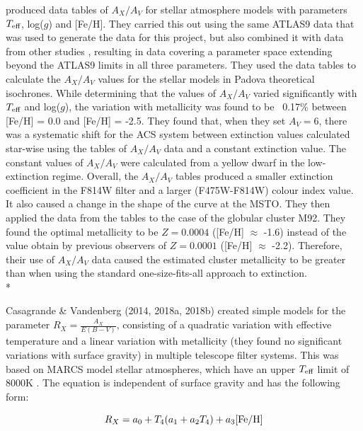 \documentclass[12pt, a4paper]{report}
\begin{document}
\cite{2008PASP..120..583G} produced data tables of $A_{X}/A_{V}$ for stellar atmosphere models with parameters $T_{\textnormal{eff}}$, log($g$) and [Fe/H]. They carried this out using the same ATLAS9 data \citep{2004astro.ph..5087C} that was used to generate the data for this project, but also combined it with data from other studies \cite{2002A&A...391..195G}, resulting in data covering a parameter space extending beyond the ATLAS9 limits in all three parameters. They used the data tables to calculate the $A_{X}/A_{V}$ values for the stellar models in Padova theoretical isochrones. While determining that the values of $A_{X}/A_{V}$ varied significantly with $T_{\textnormal{eff}}$ and log($g$), the variation with metallicity was found to be ~0.17$\%$ between [Fe/H] = 0.0 and [Fe/H] = -2.5. They found that, when they set $A_{V} = 6$, there was a systematic shift for the ACS system between extinction values calculated star-wise using the tables of $A_{X}/A_{V}$ data and a constant extinction value. The constant values of $A_{X}/A_{V}$ were calculated from a yellow dwarf in the low-extinction regime. Overall, the $A_{X}/A_{V}$ tables produced a smaller extinction coefficient in the F814W filter and a larger (F475W-F814W) colour index value. It also caused a change in the shape of the curve at the MSTO. They then applied the data from the tables to the case of the globular cluster M92. They found the optimal metallicity to be $Z = 0.0004$ ([Fe/H] $\approx$ -1.6) instead of the value obtain by previous observers of $Z = 0.0001$ ([Fe/H] $\approx$ -2.2). Therefore, their use of $A_{X}/A_{V}$ data caused the estimated cluster metallicity to be greater than when using the standard one-size-fits-all approach to extinction.\\*

Casagrande \& Vandenberg (2014, 2018a, 2018b) created simple  models for the parameter $R_{X}  = \frac{A_{X}}{E(B-V)}$, consisting of a quadratic variation with effective temperature and a linear variation with metallicity (they found no significant variations with surface gravity) in multiple telescope filter systems. This was based on MARCS model stellar atmospheres, which have an upper $T_{\textnormal{eff}}$ limit of 8000K \citep{2008A&A...486..951G}. The equation is independent of surface gravity and has the following form:

\begin{equation}
R_{X} = a_{0} + T_{4}(a_{1} + a_{2}T_{4}) + a_{3}\textnormal{[Fe/H]}
\label{casagrande_ext_fit}
\end{equation}
\end{document}
